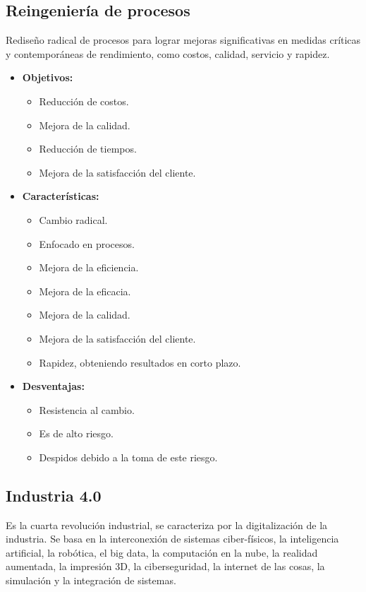\documentclass{templateNote}
\begin{document}
\subsection{Reingeniería de procesos}
\noindent Rediseño radical de procesos para lograr mejoras significativas en medidas críticas y contemporáneas de rendimiento, como costos, calidad, servicio y rapidez.
\begin{itemize}
    \item \textbf{Objetivos:}
    \begin{itemize}
        \item Reducción de costos.
        \item Mejora de la calidad.
        \item Reducción de tiempos.
        \item Mejora de la satisfacción del cliente.
    \end{itemize}
    \item \textbf{Características:}
    \begin{itemize}
        \item Cambio radical.
        \item Enfocado en procesos.
        \item Mejora de la eficiencia.
        \item Mejora de la eficacia.
        \item Mejora de la calidad.
        \item Mejora de la satisfacción del cliente.
        \item Rapidez, obteniendo resultados en corto plazo.
    \end{itemize}
    \item \textbf{Desventajas:}
    \begin{itemize}
        \item Resistencia al cambio.
        \item Es de alto riesgo.
        \item Despidos debido a la toma de este riesgo.
    \end{itemize}
\end{itemize}
\subsection{Industria 4.0}
\noindent Es la cuarta revolución industrial, se caracteriza por la digitalización de la industria. Se basa en la interconexión de sistemas ciber-físicos, la inteligencia artificial, la robótica, el big data, la computación en la nube, la realidad aumentada, la impresión 3D, la ciberseguridad, la internet de las cosas, la simulación y la integración de sistemas.
\end{document}
